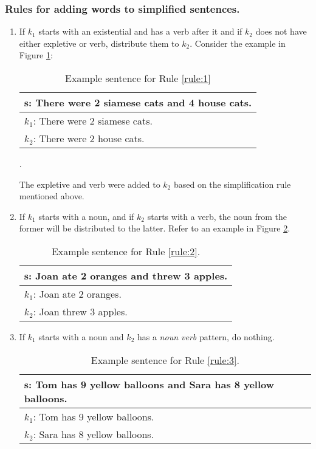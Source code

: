 \documentclass[11pt]{article}
\begin{document}
\subsubsection{Rules for adding words to simplified sentences.}\label{sec:secondsentencesimplification}
\begin{enumerate}
\item \label{rule:1}
If $\mathit{k_{1}}$ starts with an existential and has a verb after it and if $\mathit{k_{2}}$ does not have either expletive or verb, distribute them to $\mathit{k_{2}}$. Consider the example in Figure \ref{figure:3}:

\begin{table}[h!]
\centering
\begin{tabular}{ | m{7cm} | }
\hline
 $\mathbf{s}$\textbf{: There were 2 siamese cats and 4 house cats.}\\
\hline
$\mathit{k_{1}}$: There were 2 siamese cats.\\
\hline
$\mathit{k_{2}}$: There were 2 house cats.\\
\hline
\end{tabular}
\caption{Example sentence for Rule \ref{rule:1}}.
\label{figure:3}
\end{table}

The expletive and verb were added to $\mathit{k_{2}}$ based on the simplification rule mentioned above.

\item \label{rule:2}
If $\mathit{k_{1}}$ starts with a noun, and if $\mathit{k_{2}}$ starts with a verb, the noun from the former will be distributed to the latter. Refer to an example in Figure \ref{figure:4}.

\begin{table}[h!]
\centering
\begin{tabular}{ | m{7cm} | }
\hline
 $\mathbf{s}$\textbf{: Joan ate 2 oranges and threw 3 apples.}\\
\hline
$\mathit{k_{1}}$: Joan ate 2 oranges.\\
\hline
$\mathit{k_{2}}$: Joan threw 3 apples.\\
\hline
\end{tabular}
\caption{Example sentence for Rule \ref{rule:2}.}
\label{figure:4}
\end{table}

\item  \label{rule:3}
If $\mathit{k_{1}}$ starts with a noun and $\mathit{k_{2}}$ has a \textit{noun verb} pattern, do nothing.

\begin{table}[h!]
\centering
\begin{tabular}{ | m{7cm} | }
\hline
 $\mathbf{s}$\textbf{: Tom has 9 yellow balloons and Sara has 8 yellow balloons.}\\
\hline
$\mathit{k_{1}}$: Tom has 9 yellow balloons.\\
\hline
$\mathit{k_{2}}$: Sara has 8 yellow balloons.\\
\hline
\end{tabular}
\caption{Example sentence for Rule  \ref{rule:3}.}
\label{figure:5}
\end{table}


\end{enumerate}
\end{document}

